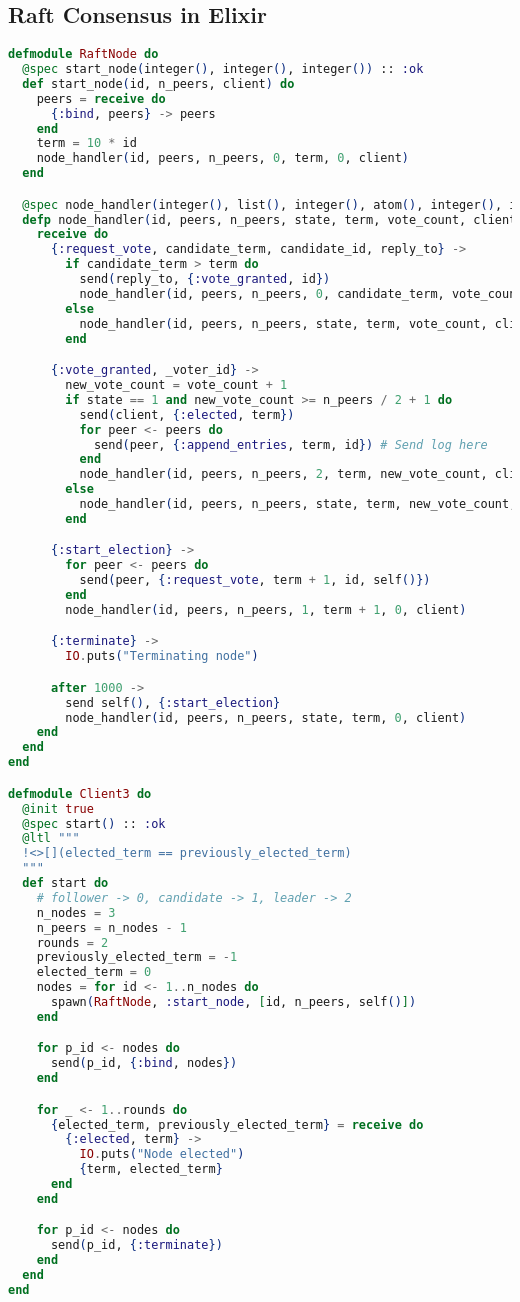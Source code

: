 \subsection{Raft Consensus in Elixir}
\begin{lstlisting}[language=Elixir, xleftmargin=.1\linewidth]
  defmodule RaftNode do
  @spec start_node(integer(), integer(), integer()) :: :ok
  def start_node(id, n_peers, client) do
    peers = receive do
      {:bind, peers} -> peers
    end
    term = 10 * id
    node_handler(id, peers, n_peers, 0, term, 0, client)
  end

  @spec node_handler(integer(), list(), integer(), atom(), integer(), integer(), integer()) :: :ok
  defp node_handler(id, peers, n_peers, state, term, vote_count, client) do
    receive do
      {:request_vote, candidate_term, candidate_id, reply_to} ->
        if candidate_term > term do
          send(reply_to, {:vote_granted, id})
          node_handler(id, peers, n_peers, 0, candidate_term, vote_count, client)
        else
          node_handler(id, peers, n_peers, state, term, vote_count, client)
        end

      {:vote_granted, _voter_id} ->
        new_vote_count = vote_count + 1
        if state == 1 and new_vote_count >= n_peers / 2 + 1 do
          send(client, {:elected, term})
          for peer <- peers do
            send(peer, {:append_entries, term, id}) # Send log here
          end
          node_handler(id, peers, n_peers, 2, term, new_vote_count, client)
        else
          node_handler(id, peers, n_peers, state, term, new_vote_count, client)
        end

      {:start_election} ->
        for peer <- peers do
          send(peer, {:request_vote, term + 1, id, self()})
        end
        node_handler(id, peers, n_peers, 1, term + 1, 0, client)

      {:terminate} ->
        IO.puts("Terminating node")

      after 1000 ->
        send self(), {:start_election}
        node_handler(id, peers, n_peers, state, term, 0, client)
    end
  end
end

defmodule Client3 do
  @init true
  @spec start() :: :ok
  @ltl """
  !<>[](elected_term == previously_elected_term)
  """
  def start do
    # follower -> 0, candidate -> 1, leader -> 2
    n_nodes = 3
    n_peers = n_nodes - 1
    rounds = 2
    previously_elected_term = -1
    elected_term = 0
    nodes = for id <- 1..n_nodes do
      spawn(RaftNode, :start_node, [id, n_peers, self()])
    end

    for p_id <- nodes do
      send(p_id, {:bind, nodes})
    end

    for _ <- 1..rounds do
      {elected_term, previously_elected_term} = receive do
        {:elected, term} ->
          IO.puts("Node elected")
          {term, elected_term}
      end
    end

    for p_id <- nodes do
      send(p_id, {:terminate})
    end
  end
end
\end{lstlisting}